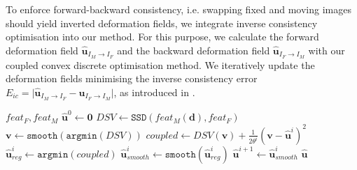 To enforce forward-backward consistency, i.e. swapping fixed and moving images should yield inverted deformation fields, we integrate inverse consistency optimisation into our method. For this purpose, we calculate the forward deformation field $\mathbf{\hat{u}}_{I_{M}\rightarrow I_{F}}$ and the backward deformation field $\mathbf{\hat{u}}_{I_{F}\rightarrow I_{M}}$ with our coupled convex discrete optimisation method. We iteratively update the deformation fields minimising the inverse consistency error $E_{ic} = \vert \mathbf{\hat{u}}_{I_{M}\rightarrow I_{F}} - \mathbf{\hat{u}}_{I_{F}\rightarrow I_{M}} \vert$, as introduced in \citep{heinrich2014non}.

\begin{algorithm}
\caption{Coupled convex discrete optimisation}\label{alg:Coupled}

\begin{algorithmic}[1]
\State\scriptsize$feat_F, feat_M$
\State \scriptsize $\mathbf{\hat{u}}^0 \gets \mathbf{0}$ 
\State \scriptsize $DSV \gets \texttt{SSD}(feat_M(\mathbf{d}), feat_F)$ 
\State \scriptsize $\mathbf{v} \gets \texttt{smooth}(\texttt{argmin}(DSV))$  \scriptsize
{} 
\State \scriptsize $coupled \gets DSV(\mathbf{v})+\frac{1}{2\theta^i}(\mathbf{v}-\mathbf{\hat{u}}^i)^2$ 
\State \scriptsize $\mathbf{\hat{u}}^i_{reg} \gets \texttt{argmin}(coupled)$ 
\State \scriptsize $\mathbf{\hat{u}}^i_{smooth} \gets \texttt{smooth}(\mathbf{\hat{u}}^i_{reg})$ 
\State \scriptsize $\mathbf{\hat{u}}^{i+1} \gets \mathbf{\hat{u}}^i_{smooth}$ 
\scriptsize \EndFor
\State\scriptsize$\mathbf{\hat{u}}$

\end{algorithmic}
\end{algorithm}

